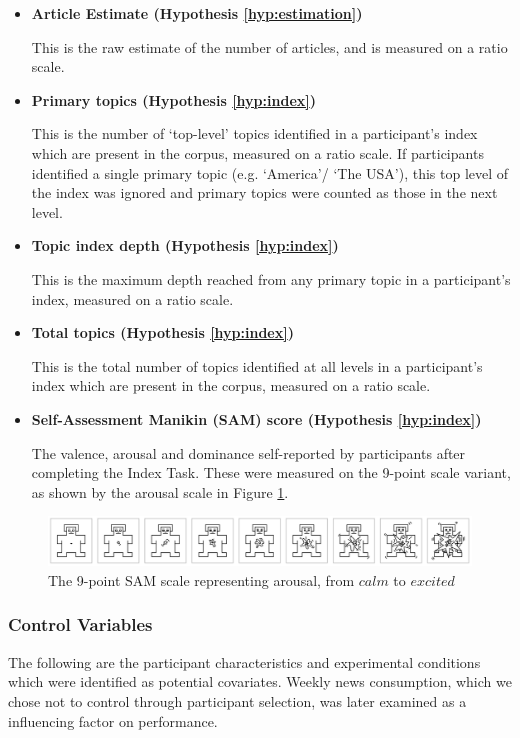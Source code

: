 \begin{itemize}
	\item\textbf{Article Estimate (Hypothesis \ref{hyp:estimation})} \par
		This is the raw estimate of the number of articles, and is measured on a ratio scale. 
	\item\textbf{Primary topics (Hypothesis \ref{hyp:index})} \par
		This is the number of `top-level' topics identified in a participant's index which are present in the corpus, measured on a ratio scale. If participants identified a single primary topic (e.g. `America'/ `The USA'), this top level of the index was ignored and primary topics were counted as those in the next level.
	\item\textbf{Topic index depth (Hypothesis \ref{hyp:index})} \par
		This is the maximum depth reached from any primary topic in a participant's index, measured on a ratio scale.
	\item\textbf{Total topics (Hypothesis \ref{hyp:index})} \par
		This is the total number of topics identified at all levels in a participant's index which are present in the corpus, measured on a ratio scale.
	\item\textbf{Self-Assessment Manikin (SAM) score (Hypothesis \ref{hyp:index})} \par
		The valence, arousal and dominance self-reported  by participants after completing the Index Task. These were measured on the 9-point scale variant, as shown by the arousal scale in Figure \ref{fig:9sam}.
\end{itemize}
\begin{figure}[htbp!]
	\includegraphics[width=\textwidth]{img/evaluation/dominance.png}
	\caption{The 9-point SAM scale representing arousal, from $calm$ to $excited$ \citep{measuringemotion}}
	\label{fig:9sam}
\end{figure}

\subsubsection{Control Variables}
The following are the participant characteristics and experimental conditions which were identified as potential covariates. Weekly news consumption, which we chose not to control through participant selection, was later examined as a influencing factor on performance.

